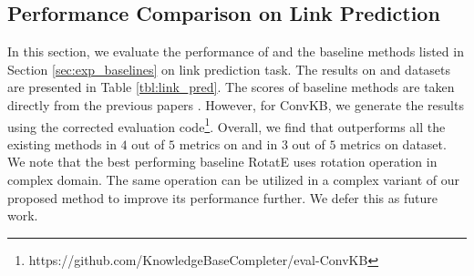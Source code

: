 \documentclass{article} \usepackage{iclr2020_conference,times}
\begin{document}
\vspace{-1mm}
\subsection{Performance Comparison on Link Prediction}
\label{sec:results_link}
\vspace{-1mm}
In this section, we evaluate the performance of \method{} and the baseline methods listed in Section \ref{sec:exp_baselines} on link prediction task. The results on \datafbn{} and \datawnn{} datasets are presented in Table \ref{tbl:link_pred}. The scores of baseline methods are taken directly from the previous papers \citep{rotate,kbgan,sacn_paper,hyper,convr,vrgcn}. However, for ConvKB, we generate the results using the corrected evaluation code\footnote{https://github.com/KnowledgeBaseCompleter/eval-ConvKB}. Overall, we find that \method{} outperforms all the existing methods in $4$ out of $5$ metrics on \datafbn{} and in $3$ out of $5$ metrics on \datawnn{} dataset. We note that the best performing baseline RotatE uses rotation operation in complex domain. The same operation can be utilized in a complex variant of our proposed method to improve its performance further. We defer this as future work.
\end{document}
